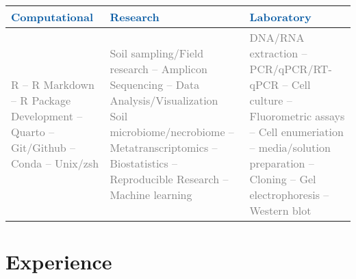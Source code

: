 \documentclass[11pt,a4paper,]{awesome-cv}
\begin{document}
\begin{table}[!h]
\centering\begingroup\fontsize{9}{11}\selectfont

\begin{tabular}{>{\centering\arraybackslash}m{4.85cm}>{\centering\arraybackslash}m{4.85cm}>{\centering\arraybackslash}m{4.85cm}}
\toprule
\textcolor[HTML]{075aa3}{\textbf{Computational}} & \textcolor[HTML]{075aa3}{\textbf{Research}} & \textcolor[HTML]{075aa3}{\textbf{Laboratory}}\\
\midrule
\textcolor[HTML]{7f7f7f}{R -- R Markdown -- R Package Development -- Quarto --Git/Github -- Conda -- Unix/zsh} & \textcolor[HTML]{7f7f7f}{Soil sampling/Field research -- Amplicon Sequencing -- Data Analysis/Visualization Soil microbiome/necrobiome -- Metatranscriptomics -- Biostatistics -- Reproducible Research -- Machine learning} & \textcolor[HTML]{7f7f7f}{DNA/RNA extraction -- PCR/qPCR/RT-qPCR -- Cell culture -- Fluorometric assays -- Cell enumeriation -- media/solution preparation -- Cloning -- Gel electrophoresis -- Western blot}\\
\bottomrule
\end{tabular}
\endgroup{}
\end{table}

\hypertarget{experience}{%
\section{\texorpdfstring{\faBarChart Experience}{Experience}}\label{experience}}
\end{document}
